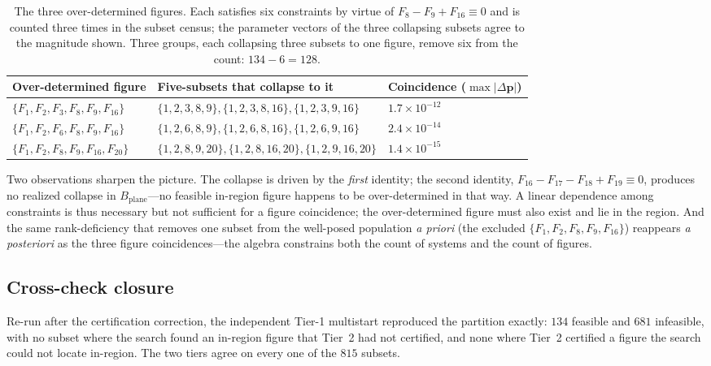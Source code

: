 \documentclass[11pt]{article}
\newcommand{\Bplane}{B_{\mathrm{plane}}}
\begin{document}
\begin{table}[h]
\centering
\begin{tabular}{lll}
\toprule
Over-determined figure & Five-subsets that collapse to it & Coincidence ($\max|\Delta\mathbf{p}|$)\\
\midrule
$\{F_1,F_2,F_3,F_8,F_9,F_{16}\}$ & $\{1,2,3,8,9\},\{1,2,3,8,16\},\{1,2,3,9,16\}$ & $1.7\times10^{-12}$\\
$\{F_1,F_2,F_6,F_8,F_9,F_{16}\}$ & $\{1,2,6,8,9\},\{1,2,6,8,16\},\{1,2,6,9,16\}$ & $2.4\times10^{-14}$\\
$\{F_1,F_2,F_8,F_9,F_{16},F_{20}\}$ & $\{1,2,8,9,20\},\{1,2,8,16,20\},\{1,2,9,16,20\}$ & $1.4\times10^{-15}$\\
\bottomrule
\end{tabular}
\caption{The three over-determined figures. Each satisfies six constraints by virtue of $F_8-F_9+F_{16}\equiv0$ and is counted three times in the subset census; the parameter vectors of the three collapsing subsets agree to the magnitude shown. Three groups, each collapsing three subsets to one figure, remove six from the count: $134-6=128$.}
\label{tab:overdet}
\end{table}

Two observations sharpen the picture. The collapse is driven by the \emph{first} identity; the second identity, $F_{16}-F_{17}-F_{18}+F_{19}\equiv0$, produces no realized collapse in $\Bplane$---no feasible in-region figure happens to be over-determined in that way. A linear dependence among constraints is thus necessary but not sufficient for a figure coincidence; the over-determined figure must also exist and lie in the region. And the same rank-deficiency that removes one subset from the well-posed population \emph{a priori} (the excluded $\{F_1,F_2,F_8,F_9,F_{16}\}$) reappears \emph{a posteriori} as the three figure coincidences---the algebra constrains both the count of systems and the count of figures.

\subsection{Cross-check closure}

Re-run after the certification correction, the independent Tier-1 multistart reproduced the partition exactly: $134$ feasible and $681$ infeasible, with no subset where the search found an in-region figure that Tier~2 had not certified, and none where Tier~2 certified a figure the search could not locate in-region. The two tiers agree on every one of the $815$ subsets.
\end{document}
